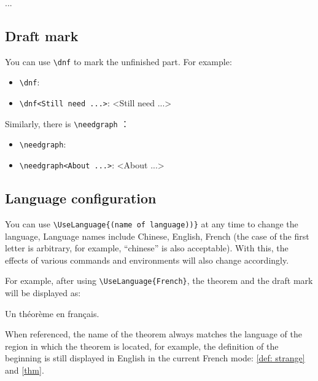 \documentclass{lebhart}
\begin{document}
\begin{proofidea}
    ...
\end{proofidea}

\subsection{Draft mark}

You can use \lstinline|\dnf| to mark the unfinished part. For example:
\begin{itemize}
    \item \lstinline|\dnf|: \quad \dnf
    \item \lstinline|\dnf<Still need ...>|: \quad \dnf<Still need ...>
\end{itemize}

Similarly, there is \lstinline|\needgraph| ：
\begin{itemize}
    \item \lstinline|\needgraph|: \needgraph
    \item \lstinline|\needgraph<About ...>|: \needgraph<About ...>
\end{itemize}

\subsection{Language configuration}
You can use \lstinline|\UseLanguage{(name of language))}| at any time to change the language, Language names include Chinese, English, French (the case of the first letter is arbitrary, for example, ``chinese'' is also acceptable). With this, the effects of various commands and environments will also change accordingly.

For example, after using \lstinline|\UseLanguage{French}|, the theorem and the draft mark will be displayed as:

\begin{theorem}[Inutile]\label{thm}
    Un théorème en français. \dnf
\end{theorem}

When referenced, the name of the theorem always matches the language of the region in which the theorem is located, for example, the definition of the beginning is still displayed in English in the current French mode: \cref{def: strange} and \cref{thm}. 

\end{document}
